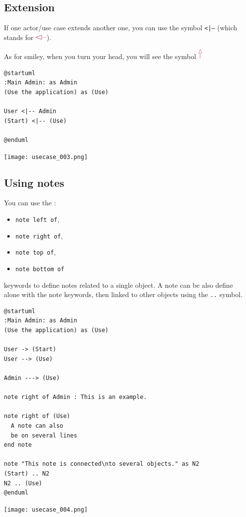 \newpage \subsection{Extension}

\begin{description}
\item If one actor/use case extends another one, you can use the symbol
\texttt{<|--} (which stands for \includegraphics[width=6mm]{img/extends01.png}).
\item As for smiley, when you turn your head, you will see the symbol
\includegraphics[width=2mm]{img/extends02.png}
\end{description}
  	
\begin{lstlisting}
@startuml
:Main Admin: as Admin
(Use the application) as (Use)

User <|-- Admin
(Start) <|-- (Use)

@enduml
\end{lstlisting}
\begin{center}
\texttt{[image: usecase\_003.png]}
\end{center}

\newpage \subsection{Using notes}

You can use the :
\begin{itemize}
  \item \texttt{note left of},
  \item \texttt{note right of}, 
  \item \texttt{note top of},
  \item \texttt{note bottom of}
\end{itemize}
keywords to define notes related to a single object.
A note can be also define alone with the note keywords, then
linked to other objects using the \texttt{..} symbol.

\begin{lstlisting}
@startuml
:Main Admin: as Admin
(Use the application) as (Use)

User -> (Start)
User --> (Use)

Admin ---> (Use)

note right of Admin : This is an example.

note right of (Use)
  A note can also
  be on several lines
end note

note "This note is connected\nto several objects." as N2
(Start) .. N2
N2 .. (Use)
@enduml
\end{lstlisting}
\begin{center}
\texttt{[image: usecase\_004.png]}
\end{center}

